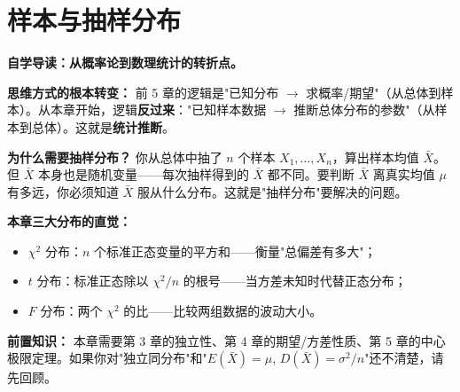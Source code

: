 ﻿\documentclass[lang=cn,11pt]{elegantbook}
\begin{document}
\chapter{样本与抽样分布}

\begin{note}
\textbf{自学导读：从概率论到数理统计的转折点。}

\textbf{思维方式的根本转变：} 前 5 章的逻辑是"已知分布 $\to$ 求概率/期望"（从总体到样本）。从本章开始，逻辑\textbf{反过来}："已知样本数据 $\to$ 推断总体分布的参数"（从样本到总体）。这就是\textbf{统计推断}。

\textbf{为什么需要抽样分布？} 你从总体中抽了 $n$ 个样本 $X_1,\dots,X_n$，算出样本均值 $\bar{X}$。但 $\bar{X}$ 本身也是随机变量——每次抽样得到的 $\bar{X}$ 都不同。要判断 $\bar{X}$ 离真实均值 $\mu$ 有多远，你必须知道 $\bar{X}$ 服从什么分布。这就是"抽样分布"要解决的问题。

\textbf{本章三大分布的直觉：}
\begin{itemize}
    \item $\chi^2$ 分布：$n$ 个标准正态变量的平方和——衡量"总偏差有多大"；
    \item $t$ 分布：标准正态除以 $\chi^2/n$ 的根号——当方差未知时代替正态分布；
    \item $F$ 分布：两个 $\chi^2$ 的比——比较两组数据的波动大小。
\end{itemize}

\textbf{前置知识：} 本章需要第 3 章的独立性、第 4 章的期望/方差性质、第 5 章的中心极限定理。如果你对"独立同分布"和"$E(\bar{X})=\mu$, $D(\bar{X})=\sigma^2/n$"还不清楚，请先回顾。
\end{note}
\end{document}
